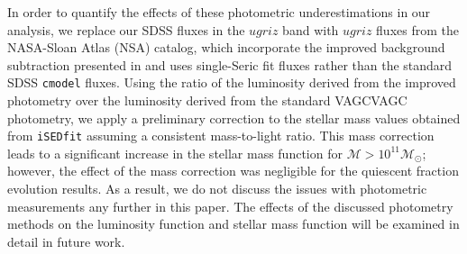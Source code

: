 \documentclass{emulateapj}
\begin{document}
In order to quantify the effects of these photometric underestimations in our analysis, we replace our SDSS fluxes in the $ugriz$ band with $ugriz$ fluxes from the NASA-Sloan Atlas (NSA) catalog, which incorporate the improved background subtraction presented in \cite{Blanton:2011aa} and uses single-Seric fit fluxes rather than the standard SDSS \texttt{cmodel} fluxes. Using the ratio of the luminosity derived from the improved photometry over the luminosity derived from the standard VAGCVAGC photometry, we apply a preliminary correction to the stellar mass values obtained from \texttt{iSEDfit} assuming a consistent mass-to-light ratio. This mass correction leads to a significant increase in the stellar mass function for $\mathcal{M} > 10^{11} \mathcal{M}_{\odot}$; however, the effect of the mass correction was negligible for the quiescent fraction evolution results. As a result, we do not discuss the issues with photometric measurements any further in this paper. The effects of the discussed photometry methods on the luminosity function and stellar mass function will be examined in detail in future work. 
\end{document}
